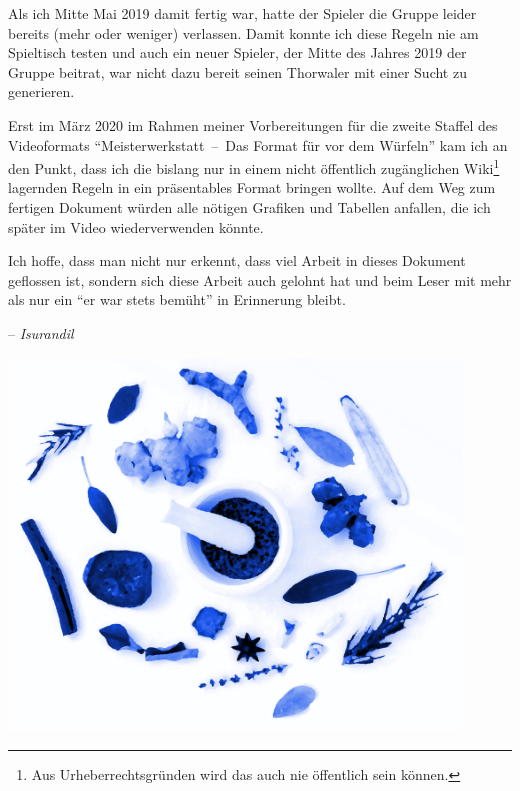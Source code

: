 Als ich Mitte Mai 2019 damit fertig war, hatte der Spieler die Gruppe leider bereits (mehr oder weniger) verlassen. Damit konnte ich diese Regeln nie am Spieltisch testen und auch ein neuer Spieler, der Mitte des Jahres 2019 der Gruppe beitrat, war nicht dazu bereit seinen Thorwaler mit einer Sucht zu generieren.

Erst im März 2020 im Rahmen meiner Vorbereitungen für die zweite Staffel des Videoformats \enquote{Meisterwerkstatt~--~Das Format für vor dem Würfeln} kam ich an den Punkt, dass ich die bislang nur in einem nicht öffentlich zugänglichen Wiki\footnote{Aus Urheberrechtsgründen wird das auch nie öffentlich sein können.} lagernden Regeln in ein präsentables Format bringen wollte. Auf dem Weg zum fertigen Dokument würden alle nötigen Grafiken und Tabellen anfallen, die ich später im Video wiederverwenden könnte.

Ich hoffe, dass man nicht nur erkennt, dass viel Arbeit in dieses Dokument geflossen ist, sondern sich diese Arbeit auch gelohnt hat und beim Leser mit mehr als nur ein \enquote{er war stets bemüht} in Erinnerung bleibt.

\bigskip\noindent
{\raggedleft-- \emph{Isurandil}\par}

\vfill
\begin{center}
	\label{img-herbs-title}
	\includegraphics[width=12cm]{res/herbs-906140.png}
\end{center}
\newpage

